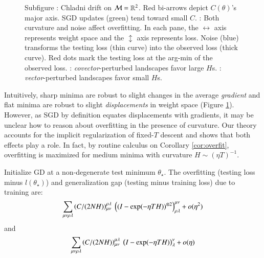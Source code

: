             \begin{figure}%
                \centering
                \crunch\squash
                \hspace{0.050cm}
                \caption{%
                    Subfigure %
                    {\!\!\protect{}}:
                    Chladni drift on $\mathcal{M}=\mathbb{R}^2$.  Red bi-arrows depict
                    $C(\theta)$'s major axis.  SGD updates (green) tend toward
                    small $C$.
                    {\protect{}}: Both curvature and noise affect overfitting.
                    In each pane, the  $\leftrightarrow$
                    axis represents weight space and the $\updownarrow$
                    axis represents loss.  Noise (blue) transforms
                    the testing loss (thin curve) into the observed loss
                    (thick curve).  Red dots mark the testing loss at the
                    arg-min of the observed loss.  \protect{}:
                    \emph{covector}-perturbed landscapes favor large $H$s.
                    \protect{}: \emph{vector}-perturbed landscapes
                    favor small $H$s.  %
                }
                \label{fig:spring}
            \end{figure}
            Intuitively, sharp minima are robust to slight changes in the
            average \emph{gradient} and flat minima are robust to slight
            \emph{displacements} in weight space (Figure
            \ref{fig:spring}\protect{}).  However, as SGD by
            definition equates displacements with gradients, it may be unclear
            how to reason about overfitting in the presence of curvature.
            Our theory accounts for the implicit
            regularization of fixed-$T$ descent and shows that both effects play
            a role.  In fact, by routine calculus on 
            Corollary \ref{cor:overfit}, overfitting is maximized for medium
            minima with curvature $H \sim (\eta T)^{-1}$.
            \begin{cor}\label{cor:overfit}
                Initialize GD at a non-degenerate test minimum $\theta_\star$.
                The overfitting (testing loss minus $l(\theta_\star)$) and generalization
                gap (testing minus training loss) due to training are:
                $$
                    \sum_{\mu\nu\rho\lambda}
                    \left(C/(2NH)\right)_{\mu\nu}^{\rho\lambda} ~
                        \left((I - \exp(-\eta T H))^{\otimes 2}\right)^{\mu\nu}_{\rho\lambda}
                        + o(\eta^2)
                $$
                and
                $$
                    \sum_{\mu\nu\rho\lambda}
                    \left(C/(2NH)\right)_{\mu\nu}^{\mu\lambda} ~
                        \left(I - \exp(-\eta T H)\right)^{\nu}_{\lambda}
                        + o(\eta)
                $$
            \end{cor}
